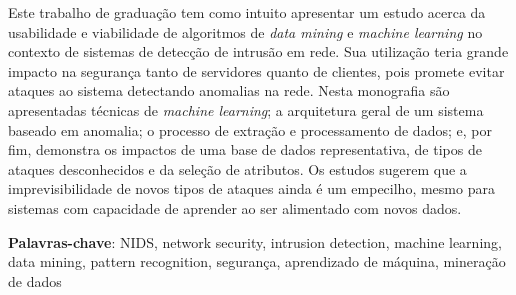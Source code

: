 %
%

Este trabalho de graduação tem como intuito apresentar um estudo acerca da usabilidade e viabilidade de
algoritmos de \textit{data mining} e \textit{machine learning} no contexto de sistemas de detecção de
intrusão em rede. Sua utilização teria grande impacto na segurança tanto de servidores quanto de clientes,
pois promete evitar ataques ao sistema detectando anomalias na rede.
Nesta monografia são apresentadas técnicas de \textit{machine learning}; a arquitetura geral
de um sistema baseado em anomalia; o processo de extração e processamento de dados; e, por fim, demonstra
os impactos de uma base de dados representativa, de tipos de ataques desconhecidos e da seleção de atributos.
Os estudos sugerem que a imprevisibilidade de novos tipos de ataques ainda é um empecilho, mesmo para
sistemas com capacidade de aprender ao ser alimentado com novos dados.

\noindent \textbf{Palavras-chave}: NIDS, network security, intrusion detection, machine learning, data mining,
pattern recognition, segurança, aprendizado de máquina, mineração de dados

